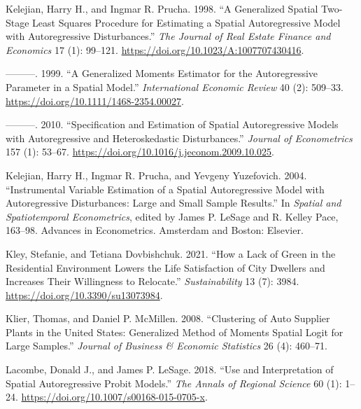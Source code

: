 \documentclass[
  letterpaper,
  DIV=11,
  numbers=noendperiod]{scrreprt}
\newlength{\cslhangindent}
\newlength{\cslentryspacingunit} %
\newenvironment{CSLReferences}[2] %
 {%
  \setlength{\parindent}{0pt}
  \ifodd #1
  \let\oldpar\par
  \def\par{\hangindent=\cslhangindent\oldpar}
  \fi
  \setlength{\parskip}{#2\cslentryspacingunit}
 }%
 {}
\begin{document}
\begin{CSLReferences}{1}{0}
\leavevmode{}%
Kelejian, Harry H., and Ingmar R. Prucha. 1998. {``A {Generalized
Spatial Two-Stage Least Squares Procedure} for {Estimating} a {Spatial
Autoregressive Model} with {Autoregressive Disturbances}.''} \emph{The
Journal of Real Estate Finance and Economics} 17 (1): 99--121.
\url{https://doi.org/10.1023/A:1007707430416}.

\leavevmode{}%
---------. 1999. {``A {Generalized Moments Estimator} for the
{Autoregressive Parameter} in a {Spatial Model}.''} \emph{International
Economic Review} 40 (2): 509--33.
\url{https://doi.org/10.1111/1468-2354.00027}.

\leavevmode{}%
---------. 2010. {``Specification and {Estimation} of {Spatial
Autoregressive Models} with {Autoregressive} and {Heteroskedastic
Disturbances}.''} \emph{Journal of Econometrics} 157 (1): 53--67.
\url{https://doi.org/10.1016/j.jeconom.2009.10.025}.

\leavevmode{}%
Kelejian, Harry H., Ingmar R. Prucha, and Yevgeny Yuzefovich. 2004.
{``Instrumental {Variable Estimation} of a {Spatial Autoregressive
Model} with {Autoregressive Disturbances}: {Large} and {Small Sample
Results}.''} In \emph{Spatial and {Spatiotemporal Econometrics}}, edited
by James P. LeSage and R. Kelley Pace, 163--98. Advances in
{Econometrics}. {Amsterdam and Boston}: {Elsevier}.

\leavevmode{}%
Kley, Stefanie, and Tetiana Dovbishchuk. 2021. {``How a {Lack} of
{Green} in the {Residential Environment Lowers} the {Life Satisfaction}
of {City Dwellers} and {Increases Their Willingness} to {Relocate}.''}
\emph{Sustainability} 13 (7): 3984.
\url{https://doi.org/10.3390/su13073984}.

\leavevmode{}%
Klier, Thomas, and Daniel P. McMillen. 2008. {``Clustering of {Auto
Supplier Plants} in the {United States}: {Generalized Method} of
{Moments Spatial Logit} for {Large Samples}.''} \emph{Journal of
Business \& Economic Statistics} 26 (4): 460--71.

\leavevmode{}%
Lacombe, Donald J., and James P. LeSage. 2018. {``Use and Interpretation
of Spatial Autoregressive Probit Models.''} \emph{The Annals of Regional
Science} 60 (1): 1--24. \url{https://doi.org/10.1007/s00168-015-0705-x}.


\end{CSLReferences}
\end{document}
